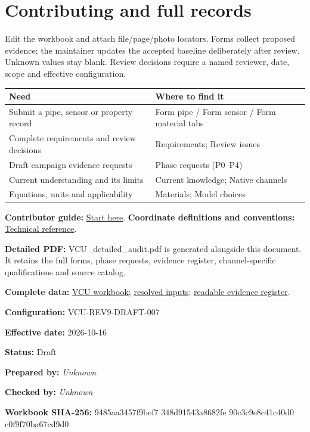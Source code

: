 \documentclass[11pt]{article}
\begin{document}
\section{Contributing and full records}\label{administration}
\label{form-pipe}\label{form-sensor}\label{form-material}\label{phase-requests}
Edit the workbook and attach file/page/photo locators. Forms collect proposed evidence; the maintainer updates the accepted baseline deliberately after review. Unknown values stay blank. Review decisions require a named reviewer, date, scope and effective configuration.
\begingroup\small\setlength{\tabcolsep}{4pt}
\begin{longtable}{>{\raggedright\arraybackslash}p{}>{\raggedright\arraybackslash}p{}}
\toprule
\textbf{Need} & \textbf{Where to find it}\\\midrule\endhead
Submit a pipe, sensor or property record & Form pipe / Form sensor / Form material tabs\\[4pt]
Complete requirements and review decisions & Requirements; Review issues\\[4pt]
Draft campaign evidence requests & Phase requests (P0--P4)\\[4pt]
Current understanding and its limits & Current knowledge; Native channels\\[4pt]
Equations, units and applicability & Materials; Model choices\\[4pt]
\bottomrule\end{longtable}\endgroup
\textbf{Contributor guide:} \href{https://github.com/Andresfierro231/Trident-Flow-Loop-Documented-Geometry/blob/main/support/docs/START_HERE.md}{Start here}. \textbf{Coordinate definitions and conventions:} \href{https://github.com/Andresfierro231/Trident-Flow-Loop-Documented-Geometry/blob/main/support/docs/TECHNICAL_REFERENCE.md}{Technical reference}.
\par
\textbf{Detailed PDF:} VCU\_detailed\_audit.pdf is generated alongside this document. It retains the full forms, phase requests, evidence register, channel-specific qualifications and source catalog.\par
\textbf{Complete data:} \href{https://github.com/Andresfierro231/Trident-Flow-Loop-Documented-Geometry/blob/main/VCU_inputs.xlsx}{VCU workbook}; \href{https://github.com/Andresfierro231/Trident-Flow-Loop-Documented-Geometry/blob/main/support/generated/resolved_inputs.json}{resolved inputs}; \href{https://github.com/Andresfierro231/Trident-Flow-Loop-Documented-Geometry/blob/main/support/generated/requirements_and_evidence.md}{readable evidence register}.\par
\textbf{Configuration:} VCU-REV9-DRAFT-007\par
\textbf{Effective date:} 2026-10-16\par
\textbf{Status:} Draft\par
\textbf{Prepared by:} \textit{Unknown}\par
\textbf{Checked by:} \textit{Unknown}\par
\textbf{Workbook SHA-256:} 9485aa3457f9bef7 348d91543a8682fe 90c3c9e8c41c40d0 c0f9f70ba67cd9d0\par
\end{document}
